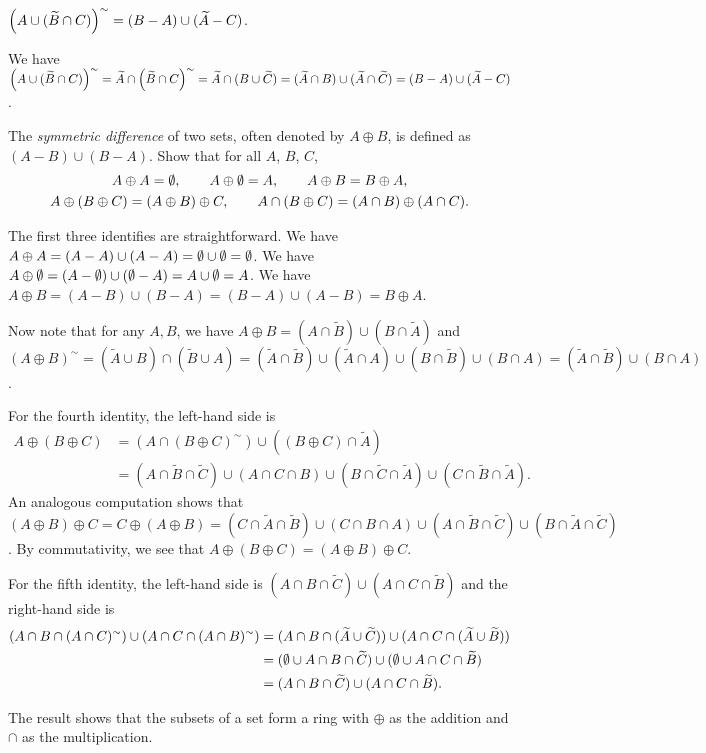 \documentclass{report}
\newcommand*{\comp}[1]{\widetilde{#1}}
\begin{document}
\begin{exercise}
$\prn{A\cup (\comp B\cap C)}^{\sim} = (B-A)\cup(\widetilde A-C)$.
\end{exercise}

\begin{solution}
We have $\prn{A\cup (\comp B\cap C)}^{\sim} = \comp A \cap \prn{\comp B \cap C}^{\sim}
=\comp A \cap (B \cup \comp C)
=(\comp A \cap B)\cup(\comp A \cap \comp C)
=(B-A)\cup(\comp A - C)$.
\end{solution}

\begin{exercise}
The \textit{symmetric difference} of two sets, often denoted by $A\oplus B$, is defined
as $(A-B)\cup(B-A)$. Show that for all $A$, $B$, $C$,
\begin{gather*}
    A\oplus A=\emptyset, \qquad A\oplus\emptyset = A, \qquad A\oplus B = B\oplus A,\\
    A\oplus(B\oplus C) = (A\oplus B)\oplus C, \qquad A\cap(B\oplus C)=(A\cap B)\oplus(A\cap C).
\end{gather*}
\end{exercise}

\begin{solution}
The first three identifies are straightforward.
We have $A\oplus A = (A-A)\cup(A-A)=\emptyset\cup\emptyset=\emptyset$.
We have $A\oplus\emptyset = (A-\emptyset)\cup(\emptyset-A)=A\cup\emptyset=A$.
We have $A\oplus B=(A-B)\cup(B-A)=(B-A)\cup(A-B)=B\oplus A$.

Now note that for any $A,B$, we have $A\oplus B=(A\cap\comp B)\cup (B\cap\comp A)$ and
$(A\oplus B)^{\sim}=(\comp A\cup B)\cap(\comp B\cup A)
=(\comp A\cap\comp B)\cup(\comp A\cap A)\cup(B\cap\comp B)\cup(B\cap A)=(\comp A\cap\comp B)\cup (B\cap A)$.

For the fourth identity, the left-hand side is
\[
\begin{aligned}
A\oplus(B\oplus C) &= (A\cap (B\oplus C)^{\sim})\cup((B\oplus C)\cap\comp A)\\
&=(A\cap\comp B\cap\comp C)\cup(A\cap C\cap B)\cup(B\cap\comp C\cap\comp A)\cup(C\cap \comp B\cap\comp A).
\end{aligned}
\]
An analogous computation shows that $(A\oplus B)\oplus C=C\oplus(A\oplus B)
=(C\cap\comp A\cap\comp B)\cup(C\cap B\cap A)\cup(A\cap\comp B\cap\comp C)\cup(B\cap \comp A\cap\comp C)$.
By commutativity, we see that $A\oplus(B\oplus C) = (A\oplus B)\oplus C$.

For the fifth identity, the left-hand side is $(A\cap B\cap\comp C)\cup (A\cap C\cap\comp B)$ and
the right-hand side is
\[
\begin{aligned}
(A\cap B\cap (A\cap C)^{\sim})\cup(A\cap C\cap(A\cap B)^{\sim})
&=(A\cap B\cap(\comp A\cup\comp C))\cup(A\cap C\cap(\comp A\cup\comp B))\\
&=(\eset \cup A\cap B\cap\comp C)\cup(\eset\cup A\cap C\cap\comp B)\\
&=(A\cap B\cap\comp C)\cup(A\cap C\cap\comp B).
\end{aligned}
\]

The result shows that the subsets of a set form a ring with $\oplus$ as the addition
and $\cap$ as the multiplication.
\end{solution}
\end{document}

